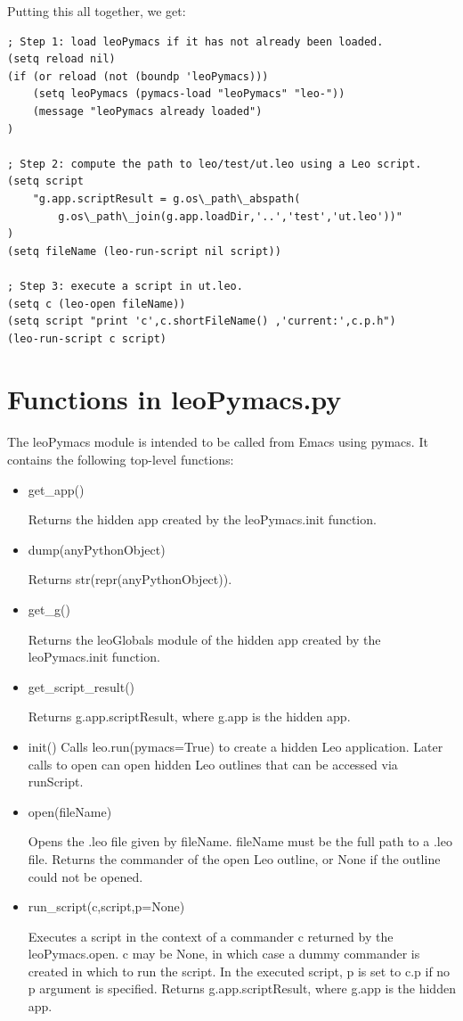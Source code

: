 \documentclass[a4paper,10pt,english]{sphinxmanual}
\begin{document}
Putting this all together, we get:

\begin{Verbatim}[commandchars=\\\{\}]
; Step 1: load leoPymacs if it has not already been loaded.
(setq reload nil)
(if (or reload (not (boundp 'leoPymacs)))
    (setq leoPymacs (pymacs-load "leoPymacs" "leo-"))
    (message "leoPymacs already loaded")
)

; Step 2: compute the path to leo/test/ut.leo using a Leo script.
(setq script
    "g.app.scriptResult = g.os\_path\_abspath(
        g.os\_path\_join(g.app.loadDir,'..','test','ut.leo'))"
)
(setq fileName (leo-run-script nil script))

; Step 3: execute a script in ut.leo.
(setq c (leo-open fileName))
(setq script "print 'c',c.shortFileName() ,'current:',c.p.h")
(leo-run-script c script)
\end{Verbatim}


\section{Functions in leoPymacs.py}
\label{emacs:functions-in-leopymacs-py}
The leoPymacs module is intended to be called from Emacs using pymacs.  It contains the following top-level functions:
\begin{itemize}
\item {} 
get\_app()

Returns the hidden app created by the leoPymacs.init function.

\item {} 
dump(anyPythonObject)

Returns str(repr(anyPythonObject)).

\item {} 
get\_g()

Returns the leoGlobals module of the hidden app created by the leoPymacs.init function.

\item {} 
get\_script\_result()

Returns g.app.scriptResult, where g.app is the hidden app.

\item {} 
init()
Calls leo.run(pymacs=True) to create a hidden Leo application.
Later calls to open can open hidden Leo outlines that can be accessed via runScript.

\item {} 
open(fileName)

Opens the .leo file given by fileName.
fileName must be the full path to a .leo file.
Returns the commander of the open Leo outline, or None if the outline could not be opened.

\item {} 
run\_script(c,script,p=None)

Executes a script in the context of a commander c returned by the leoPymacs.open.
c may be None, in which case a dummy commander is created in which to run the script.
In the executed script, p is set to c.p if no p argument is specified.
Returns g.app.scriptResult, where g.app is the hidden app.

\end{itemize}
\end{document}
